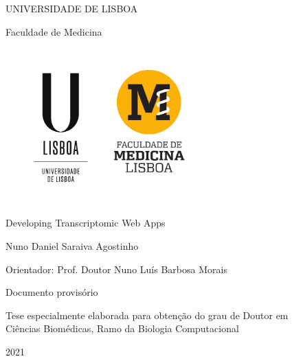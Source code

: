 \documentclass[12pt, twoside]{report}
\begin{document}
\begin{titlepage}
    \begin{center}
        \vspace*{-.2cm}
        UNIVERSIDADE DE LISBOA
        
        Faculdade de Medicina
        
        \includegraphics[width=0.6\textwidth]{images/logo/ulisboa}
        
        \vspace{1.8cm}
        Developing Transcriptomic Web Apps

        \vspace{1.1cm}        
            
        \vspace{0.9cm}            
        Nuno Daniel Saraiva Agostinho
    \end{center}

    \vspace{0.9cm}
    Orientador: Prof. Doutor Nuno Luís Barbosa Morais
    
    \vspace{2.2cm}
    \begin{center}
        Documento provisório
        
        Tese especialmente elaborada para obtenção do grau de Doutor em\\
        Ciências Biomédicas, Ramo da Biologia Computacional
            
        \vfill
        2021
        \vspace{.7cm}    
    \end{center}
\end{titlepage}

\tableofcontents


\end{document}
